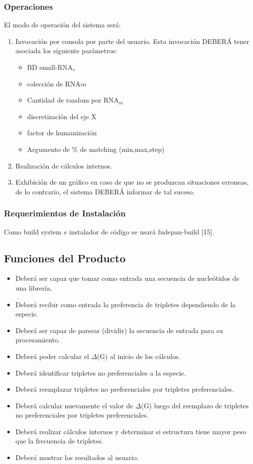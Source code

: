 \documentclass[12pt,a4paper,english,spanish]{article}
\begin{document}
	\subsubsection{Operaciones}
		El modo de operación del sistema será: 
		\begin{enumerate}
			\item Invocación por consola por parte del usuario. Esta invocación DEBERÁ tener asociada los siguiente parámetros:
				\begin{itemize}
					\item BD small-RNA$_s$
					\item colección de RNA$m$
					\item Cantidad de random por RNA$_m$
					\item discretización del eje X
					\item factor de humanización
					\item Argumento de \% de matching (min,max,step)
				\end{itemize}
			\item Realización de cálculos internos.
			\item Exhibición de un gráfico en caso de que no se produzcan situaciones erroneas, de lo contrario, el sistema DEBERÁ informar de tal suceso.
		\end{enumerate}

	\subsubsection{Requerimientos de Instalación}
		Como build system e instalador de código se usará fudepan-build [15].

\subsection{Funciones del Producto}
	\begin{itemize}
		\item Deberá ser capaz que tomar como entrada una secuencia de nucleótidos de una librería.
		\item Deberá recibir como entrada la preferencia de tripletes dependiendo de la especie.	
		\item Deberá ser capaz de parsear (dividir) la secuencia de entrada para su procesamiento.
		\item Deberá poder calcular el $\Delta$(G) al inicio de los cálculos.
		\item Deberá identificar tripletes no preferenciales a la especie.
 		\item Deberá reemplazar tripletes no preferenciales por tripletes preferenciales.
		\item Deberá calcular nuevamente el valor de $\Delta$(G) luego del reemplazo de tripletes no 			  				preferenciales por tripletes preferenciales.
		\item Deberá realizar cálculos internos y determinar si estructura tiene mayor peso que la frecuencia de 				  tripletes.
		\item Deberá mostrar los resultados al usuario.
	\end{itemize}
\end{document}
